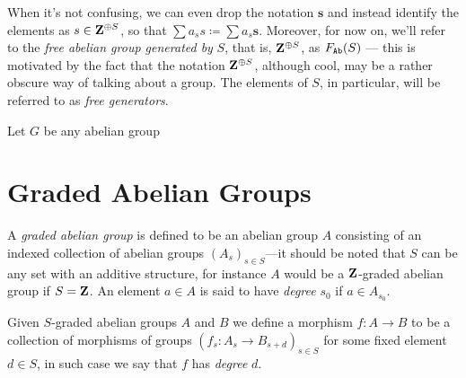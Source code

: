 \begin{notation}
When it's not confusing, we can even drop the notation \(\mathbf{s}\) and
instead identify the elements as \(s \in \mathbf{Z}^{\oplus S}\), so that
\(\sum a_s s \coloneq \sum a_s \mathbf{s}\). Moreover, for now on, we'll refer
to the \emph{free abelian group generated by} \(S\), that is, \(\mathbf{Z}^{\oplus S}\),
as \(F_{{\texttt{Ab}}}(S)\) --- this is motivated by the fact that the notation
\(\mathbf{Z}^{\oplus S}\), although cool, may be a rather obscure way of talking about a
group. The elements of \(S\), in particular, will be referred to as \emph{free
  generators}.
\end{notation}

\begin{proposition}
\label{prop:Ab-isomorphic-factor-of-free}
Let \(G\) be any abelian group
\end{proposition}


\section{Graded Abelian Groups}

\begin{definition}
\label{def:graded-abelian-group}
A \emph{graded abelian group} is defined to be an abelian group \(A\) consisting
of an indexed collection of abelian groups \((A_s)_{s \in S}\)---it should be
noted that \(S\) can be any set with an additive structure, for instance \(A\)
would be a \(\mathbf{Z}\)-graded abelian group if \(S = \mathbf{Z}\). An element \(a \in A\) is
said to have \emph{degree} \(s_0\) if \(a \in A_{s_0}\).

Given \(S\)-graded abelian groups \(A\) and \(B\) we define a morphism
\(f: A \to B\) to be a collection of morphisms of groups
\((f_s: A_s \to B_{s+d})_{s \in S}\) for some fixed element \(d \in S\), in such
case we say that \(f\) has \emph{degree} \(d\).
\end{definition}

